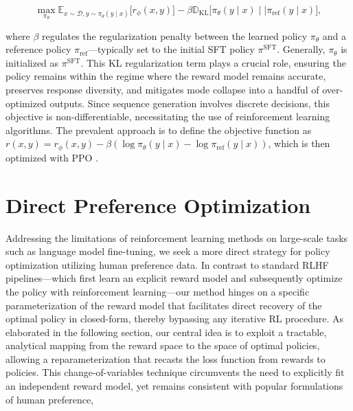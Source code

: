 \begin{equation}\label{eq:RL}
\max_{\pi_{\theta}}  \mathbb{E}_{x\sim \mathcal{D}, y\sim \pi_{\theta}(y \mid x)}\bigl[r_{\phi}(x, y)\bigr] - \beta\mathbb{D}_{\textrm{KL}}\bigl[\pi_{\theta}(y\mid x)\mid \mid \pi_\text{ref}(y\mid x)\bigr],
\end{equation}

where $\beta$ regulates the regularization penalty between the learned policy $\pi_\theta$ and a reference policy $\pi_\text{ref}$—typically set to the initial SFT policy $\pi^\text{SFT}$. Generally, $\pi_\theta$ is initialized as $\pi^\text{SFT}$. This KL regularization term plays a crucial role, ensuring the policy remains within the regime where the reward model remains accurate, preserves response diversity, and mitigates mode collapse into a handful of over-optimized outputs. Since sequence generation involves discrete decisions, this objective is non-differentiable, necessitating the use of reinforcement learning algorithms. The prevalent approach \citep{ziegler2020finetuning, stiennon2022learning, bai2022training, ouyang2022training} is to define the objective function as ${r(x, y) = r_{\phi}(x, y) -\beta (\log \pi_{\theta}(y\mid x) - \log \pi_\text{ref}(y\mid x))}$, which is then optimized with PPO \cite{schulman2017proximal}. 

\section{Direct Preference Optimization}\label{sec:DPO}

Addressing the limitations of reinforcement learning methods on large-scale tasks such as language model fine-tuning, we seek a more direct strategy for policy optimization utilizing human preference data. In contrast to standard RLHF pipelines—which first learn an explicit reward model and subsequently optimize the policy with reinforcement learning—our method hinges on a specific parameterization of the reward model that facilitates direct recovery of the optimal policy in closed-form, thereby bypassing any iterative RL procedure. As elaborated in the following section, our central idea is to exploit a tractable, analytical mapping from the reward space to the space of optimal policies, allowing a reparameterization that recasts the loss function from rewards to policies. This change-of-variables technique circumvents the need to explicitly fit an independent reward model, yet remains consistent with popular formulations of human preference,

